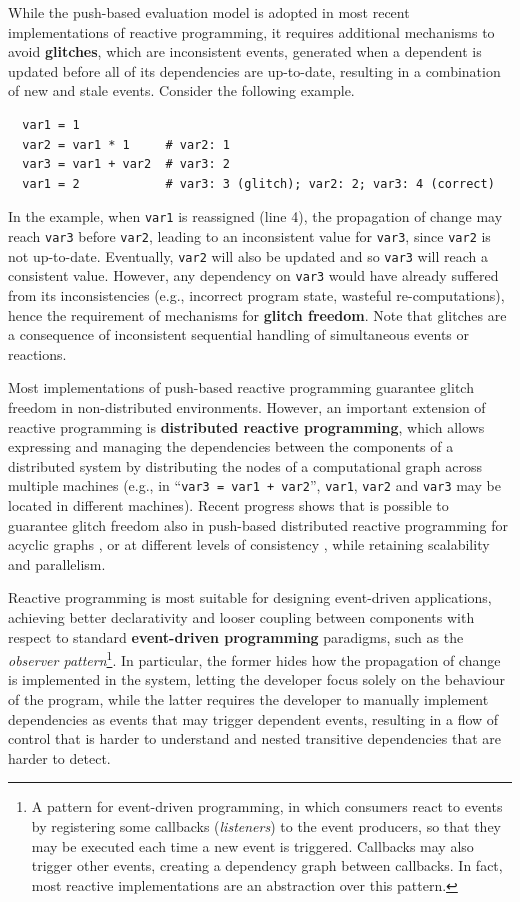 While the push-based evaluation model is adopted in most recent implementations
of reactive programming, it requires additional mechanisms to avoid
\textbf{glitches}, which are inconsistent events, generated when a dependent is
updated before all of its dependencies are up-to-date, resulting in a
combination of new and stale events. Consider the following example.

\begin{lstlisting}
  var1 = 1
  var2 = var1 * 1     # var2: 1
  var3 = var1 + var2  # var3: 2
  var1 = 2            # var3: 3 (glitch); var2: 2; var3: 4 (correct)
\end{lstlisting}

In the example, when \texttt{var1} is reassigned (line 4), the propagation of
change may reach \texttt{var3} before \texttt{var2}, leading to an inconsistent
value for \texttt{var3}, since \texttt{var2} is not up-to-date. Eventually,
\texttt{var2} will also be updated and so \texttt{var3} will reach a consistent
value. However, any dependency on \texttt{var3} would have already suffered
from its inconsistencies (e.g., incorrect program state, wasteful
re-computations), hence the requirement of mechanisms for \textbf{glitch
freedom}. Note that glitches are a consequence of inconsistent sequential
handling of simultaneous events or reactions.

Most implementations of push-based reactive programming guarantee glitch
freedom in non-distributed environments. However, an important extension of
reactive programming is \textbf{distributed reactive programming}, which allows
expressing and managing the dependencies between the components of a
distributed system by distributing the nodes of a computational graph across
multiple machines (e.g., in \enquote{\texttt{var3 = var1 + var2}},
\texttt{var1}, \texttt{var2} and \texttt{var3} may be located in different
machines). Recent progress shows that is possible to guarantee glitch freedom
also in push-based distributed reactive programming for acyclic graphs
\cite{QPROP}, or at different levels of consistency \cite{DREAM}, while
retaining scalability and parallelism.

Reactive programming is most suitable for designing event-driven applications,
achieving better declarativity and looser coupling between components with
respect to standard \textbf{event-driven programming} paradigms, such as the
\textit{observer pattern}\footnote{A pattern for event-driven programming, in
which consumers react to events by registering some callbacks
(\textit{listeners}) to the event producers, so that they may be executed each
time a new event is triggered. Callbacks may also trigger other events,
creating a dependency graph between callbacks. In fact, most reactive
implementations are an abstraction over this pattern.}. In particular, the
former hides how the propagation of change is implemented in the system,
letting the developer focus solely on the behaviour of the program, while the
latter requires the developer to manually implement dependencies as events that
may trigger dependent events, resulting in a flow of control that is harder to
understand and nested transitive dependencies that are harder to detect.
